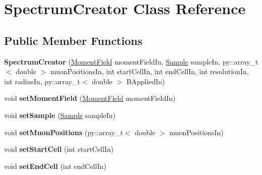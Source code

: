 \hypertarget{class_spectrum_creator}{}\section{Spectrum\+Creator Class Reference}
\label{class_spectrum_creator}
\subsection*{Public Member Functions}
\begin{DoxyCompactItemize}
\item 
\mbox{\label{class_spectrum_creator_af6ed12941c627652ba02a012b1464f97}} 
{\bfseries Spectrum\+Creator} (\mbox{\hyperlink{class_moment_field}{Moment\+Field}} moment\+Field\+In, \mbox{\hyperlink{class_sample}{Sample}} sample\+In, py\+::array\+\_\+t$<$ double $>$ muon\+Positions\+In, int start\+Cell\+In, int end\+Cell\+In, int resolution\+In, int radius\+In, py\+::array\+\_\+t$<$ double $>$ B\+Applied\+In)
\item 
\mbox{\label{class_spectrum_creator_a2517445e4cac9908786385ef90bf2cc9}} 
void {\bfseries set\+Moment\+Field} (\mbox{\hyperlink{class_moment_field}{Moment\+Field}} moment\+Field\+In)
\item 
\mbox{\label{class_spectrum_creator_a2093c87971d428bd4193de06546f4a44}} 
void {\bfseries set\+Sample} (\mbox{\hyperlink{class_sample}{Sample}} sample\+In)
\item 
\mbox{\label{class_spectrum_creator_a21c6f6365995673c8eb8248a9752a7c6}} 
void {\bfseries set\+Muon\+Positions} (py\+::array\+\_\+t$<$ double $>$ muon\+Positions\+In)
\item 
\mbox{\label{class_spectrum_creator_aaf0c2136aec63f2fdd8f317b8908e0fd}} 
void {\bfseries set\+Start\+Cell} (int start\+Cell\+In)
\item 
\mbox{\label{class_spectrum_creator_ad28a71f780395eed439936e1c787ee8e}} 
void {\bfseries set\+End\+Cell} (int end\+Cell\+In)
\item 
\mbox{\label{class_spectrum_creator_a8c608e477d058e326f60b41209f377ee}} 

\end{DoxyCompactItemize}
